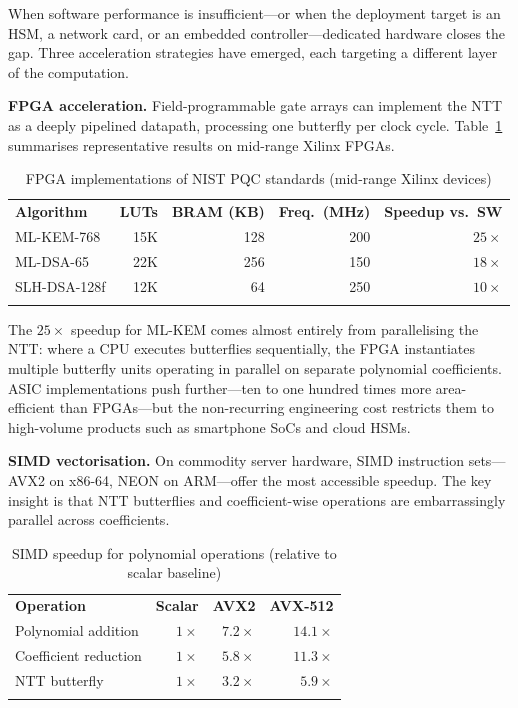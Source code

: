 When software performance is insufficient---or when the deployment target is an HSM, a network card, or an embedded controller---dedicated hardware closes the gap.  Three acceleration strategies have emerged, each targeting a different layer of the computation.

\textbf{FPGA acceleration.}\quad
Field-programmable gate arrays can implement the NTT as a deeply pipelined datapath, processing one butterfly per clock cycle.  Table~\ref{tab:fpga-accel} summarises representative results on mid-range Xilinx FPGAs.

\begin{table}[t]
\caption{FPGA implementations of NIST PQC standards (mid-range Xilinx devices)}
\label{tab:fpga-accel}
\begin{tabular}{p{2.8cm}rrrr}
\hline\noalign{\smallskip}
\textbf{Algorithm} & \textbf{LUTs} & \textbf{BRAM (KB)} & \textbf{Freq.\ (MHz)} & \textbf{Speedup vs.\ SW} \\
\noalign{\smallskip}\svhline\noalign{\smallskip}
ML-KEM-768\cite{FIPS203}   & 15K & 128 & 200 & $25\times$ \\
ML-DSA-65\cite{FIPS204}    & 22K & 256 & 150 & $18\times$ \\
SLH-DSA-128f\cite{FIPS205} & 12K &  64 & 250 & $10\times$ \\
\noalign{\smallskip}\hline
\end{tabular}
\end{table}

The $25\times$ speedup for ML-KEM comes almost entirely from parallelising the NTT: where a CPU executes butterflies sequentially, the FPGA instantiates multiple butterfly units operating in parallel on separate polynomial coefficients.  ASIC implementations push further---ten to one hundred times more area-efficient than FPGAs---but the non-recurring engineering cost restricts them to high-volume products such as smartphone SoCs and cloud HSMs.

\textbf{SIMD vectorisation.}\quad
On commodity server hardware, SIMD instruction sets---AVX2 on x86-64, NEON on ARM---offer the most accessible speedup.  The key insight is that NTT butterflies and coefficient-wise operations are embarrassingly parallel across coefficients.

\begin{table}[t]
\caption{SIMD speedup for polynomial operations (relative to scalar baseline)}
\label{tab:simd-speedup}
\begin{tabular}{p{4cm}rrr}
\hline\noalign{\smallskip}
\textbf{Operation} & \textbf{Scalar} & \textbf{AVX2} & \textbf{AVX-512} \\
\noalign{\smallskip}\svhline\noalign{\smallskip}
Polynomial addition     & $1\times$ & $7.2\times$ & $14.1\times$ \\
Coefficient reduction   & $1\times$ & $5.8\times$ & $11.3\times$ \\
NTT butterfly           & $1\times$ & $3.2\times$ & $5.9\times$ \\
\noalign{\smallskip}\hline
\end{tabular}
\end{table}

